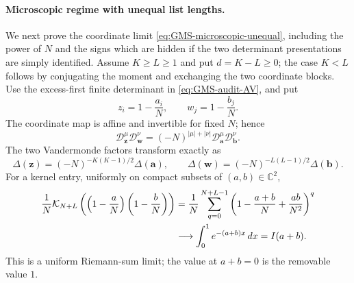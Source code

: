 \paragraph{Microscopic regime with unequal list lengths.}
We next prove the coordinate limit \eqref{eq:GMS-microscopic-unequal}, including the power of
$N$ and the signs which are hidden if the two determinant presentations are simply identified.
Assume $K\geq L\geq1$ and put $d=K-L\geq0$; the case $K<L$ follows by conjugating the
moment and exchanging the two coordinate blocks.  Use the excess-first finite determinant in
\eqref{eq:GMS-audit-AV}, and put
\begin{equation}
 z_i=1-\frac{a_i}{N},
 \qquad w_j=1-\frac{b_j}{N}.
 \label{eq:GMS-audit-micro-coordinates}
\end{equation}
The coordinate map is affine and invertible for fixed $N$; hence
\begin{equation}
 \mathcal D_{\mathbf z}^{\mu}\mathcal D_{\mathbf w}^{\nu}
 =(-N)^{|\mu|+|\nu|}
 \mathcal D_{\mathbf a}^{\mu}\mathcal D_{\mathbf b}^{\nu}.
 \label{eq:GMS-audit-micro-derivative-map}
\end{equation}
The two Vandermonde factors transform exactly as
\begin{equation}
 \Delta(\mathbf z)=(-N)^{-K(K-1)/2}\Delta(\mathbf a),
 \qquad
 \Delta(\mathbf w)=(-N)^{-L(L-1)/2}\Delta(\mathbf b).
 \label{eq:GMS-audit-micro-Vandermonde-map}
\end{equation}
For a kernel entry, uniformly on compact subsets of $(a,b)\in\mathbb C^2$,
\begin{align}
 \frac1N\mathcal K_{N+L}
 \left(\left(1-\frac aN\right)\left(1-\frac bN\right)\right)
 &=\frac1N\sum_{q=0}^{N+L-1}
 \left(1-\frac{a+b}{N}+\frac{ab}{N^2}\right)^q\notag\\
 &\longrightarrow\int_0^1e^{-(a+b)x}\,dx
 =I(a+b).
 \label{eq:GMS-audit-kernel-Riemann-limit}
\end{align}
This is a uniform Riemann-sum limit; the value at $a+b=0$ is the removable value $1$.

